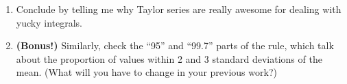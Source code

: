 \documentclass[11pt]{article}
\begin{document}
\begin{enumerate}[leftmargin=0pt]
\begin{itemize}
        \item You can't compare your computed value directly to the actual value, because the actual value is unknown!
        \item This is an alternating series, so we can use the alternating series error bound.
        \item We're actually using two values, $P(b)$ and $P(a)$, so we can accrue some error from both ends. You may have noticed something nice about how $P(b)$ and $P(a)$ are related that will be helpful.
    \end{itemize} 
    \item Conclude by telling me why Taylor series are really awesome for dealing with yucky integrals.
    \item \textbf{(Bonus!)} Similarly, check the ``95'' and ``99.7'' parts of the rule, which talk about the proportion of values within 2 and 3 standard deviations of the mean.
    (What will you have to change in your previous work?)
\end{enumerate}
\end{document}
